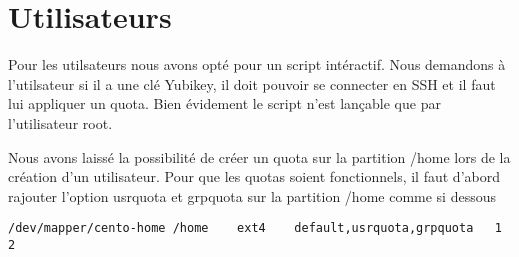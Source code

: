\section{Utilisateurs}
Pour les utilsateurs nous avons opté pour un script intéractif. Nous demandons à l'utilsateur si il a une clé Yubikey, il doit pouvoir se connecter en SSH et il faut lui appliquer un quota. Bien évidement le script n'est lançable que par l'utilisateur root.



Nous avons laissé la possibilité de créer un quota sur la partition /home lors de la création d’un utilisateur. 
Pour que les quotas soient fonctionnels, il faut d’abord rajouter l’option usrquota et grpquota sur la partition /home comme si dessous

\begin{lstlisting}
/dev/mapper/cento-home /home	ext4	default,usrquota,grpquota	1 2
\end{lstlisting}
